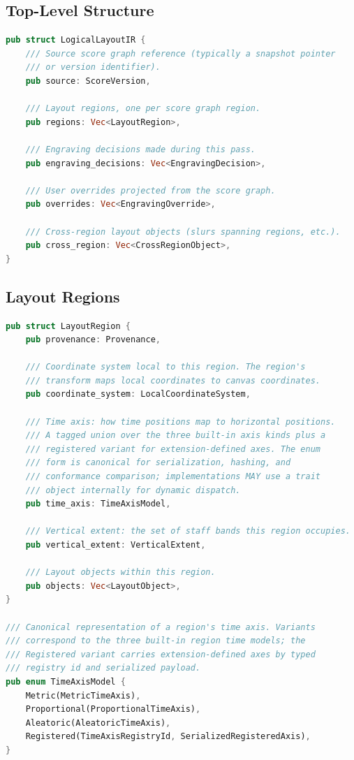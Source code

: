 \documentclass[11pt,letterpaper]{report}
\begin{document}
\subsection{Top-Level Structure}

\begin{lstlisting}[language=Rust]
pub struct LogicalLayoutIR {
    /// Source score graph reference (typically a snapshot pointer
    /// or version identifier).
    pub source: ScoreVersion,

    /// Layout regions, one per score graph region.
    pub regions: Vec<LayoutRegion>,

    /// Engraving decisions made during this pass.
    pub engraving_decisions: Vec<EngravingDecision>,

    /// User overrides projected from the score graph.
    pub overrides: Vec<EngravingOverride>,

    /// Cross-region layout objects (slurs spanning regions, etc.).
    pub cross_region: Vec<CrossRegionObject>,
}
\end{lstlisting}

\subsection{Layout Regions}

\begin{lstlisting}[language=Rust]
pub struct LayoutRegion {
    pub provenance: Provenance,

    /// Coordinate system local to this region. The region's
    /// transform maps local coordinates to canvas coordinates.
    pub coordinate_system: LocalCoordinateSystem,

    /// Time axis: how time positions map to horizontal positions.
    /// A tagged union over the three built-in axis kinds plus a
    /// registered variant for extension-defined axes. The enum
    /// form is canonical for serialization, hashing, and
    /// conformance comparison; implementations MAY use a trait
    /// object internally for dynamic dispatch.
    pub time_axis: TimeAxisModel,

    /// Vertical extent: the set of staff bands this region occupies.
    pub vertical_extent: VerticalExtent,

    /// Layout objects within this region.
    pub objects: Vec<LayoutObject>,
}

/// Canonical representation of a region's time axis. Variants
/// correspond to the three built-in region time models; the
/// Registered variant carries extension-defined axes by typed
/// registry id and serialized payload.
pub enum TimeAxisModel {
    Metric(MetricTimeAxis),
    Proportional(ProportionalTimeAxis),
    Aleatoric(AleatoricTimeAxis),
    Registered(TimeAxisRegistryId, SerializedRegisteredAxis),
}
\end{lstlisting}
\end{document}
